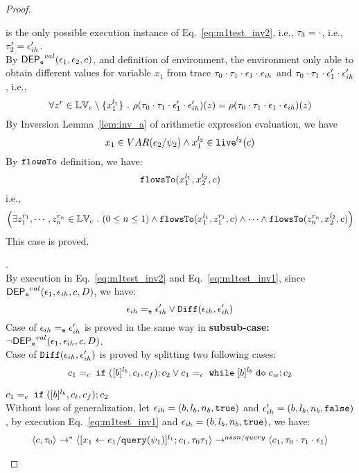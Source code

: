 \begin{proof}
\begin{case}[$\trace_2 = \trace_{ih} \cdot \event_{ih}$]
\begin{subcase}
\begin{subsubcase}
is the only possible execution instance of Eq.~\ref{eq:m1test_inv2}, i.e., $\mathtt{\tau}_3 = \cdot$, i.e., $\mathtt{\tau}_2' = \mathtt{\epsilon}_{ih}'$.
\\
By $\mathsf{DEP_{\mathtt{e}}}^{val}(\mathtt{\epsilon}_1, \mathtt{\epsilon}_2, c)$, and definition of environment, 
the environment only able to obtain different values for variable $x_1$ 
from trace $\mathtt{\tau}_0 \cdot \mathtt{\tau}_1 \cdot \mathtt{\epsilon}_1 \cdot \mathtt{\epsilon}_{ih}$ and 
$\mathtt{\tau}_0 \cdot \mathtt{\tau}_1 \cdot \mathtt{\epsilon}_1' \cdot \mathtt{\epsilon}_{ih}'$, i.e.,
\[
  \forall z^r \in \mathbb{LV}_c \setminus \{x_1^{l_1}\} ~.~
  \rho(\mathtt{\tau}_0 \cdot \mathtt{\tau}_1 \cdot \mathtt{\epsilon}_1' \cdot \mathtt{\epsilon}_{ih}') (z) =  
  \rho(\mathtt{\tau}_0 \cdot \mathtt{\tau}_1 \cdot \mathtt{\epsilon}_1 \cdot \mathtt{\epsilon}_{ih}) (z)
\]
By {Inversion Lemma~\ref{lem:inv_a}} of arithmetic expression evaluation, we have 
\[
  x_1 \in VAR(e_2 / \psi_2) \land x_1^{l_2} \in \mathtt{live}^{l_2}(c)
\]
%
By $\mathtt{flowsTo}$ definition, we have:
%
\[
\mathtt{flowsTo}(x_1^{l_1}, {x}_2^{l_2}, c)
\]
i.e.,
%
\[
\Big(\exists z_1^{r_1}, \cdots, z_n^{r_n} \in \mathbb{LV}_{{c}} ~.~ (0 \leq n \leq 1 )
 \land \mathtt{flowsTo}(x_1^{l_1}, z_1^{r_1}, c) \land \cdots \land \mathtt{flowsTo}(z_n^{r_n}, {x}_2^{l_2}, c) \Big)
\]
%
This case is proved.
\end{subsubcase}
%
\begin{subsubcase}.
\label{case:valdep_ihtestdep}
\\
%
By execution in Eq.~\ref{eq:m1test_inv2} and Eq.~\ref{eq:m1test_inv1}, since $\mathsf{DEP_{\mathtt{e}}}^{val}(\mathtt{\epsilon}_1, \mathtt{\epsilon}_{ih}, c, D)$, we have:
\[
  \mathtt{\epsilon}_{ih} =_{\mathtt{e}} \mathtt{\epsilon}_{ih}' \lor \mathtt{Diff}(\mathtt{\epsilon}_{ih}, \mathtt{\epsilon}_{ih}')
\]
%
Case of $\mathtt{\epsilon}_{ih} =_{\mathtt{e}} \mathtt{\epsilon}_{ih}'$ is proved in the same way in \textbf{subsub-case:} $\neg \mathsf{DEP_{\mathtt{e}}}^{val}(\mathtt{\epsilon}_1, \mathtt{\epsilon}_{ih}, c, D)$.
\\
Case of $\mathtt{Diff}(\mathtt{\epsilon}_{ih}, \mathtt{\epsilon}_{ih}')$ is proved by splitting two following cases:
\[
  c_1 =_c \;\mathtt{if}\; ([b]^{l_b}, c_t, c_f);{c}_2
  \lor
  c_1 =_c \;\mathtt{while}\; [b]^{l_b} \;\mathtt{do}\; c_w;{c}_2
\]
\begin{subproof} 
%
$c_1 =_c \;\mathtt{if}\; ([b]^{l_b}, c_t, c_f);{c}_2$ 
\\
Without loss of generalization, 
let $\mathtt{\epsilon}_{ih} = (b, l_b, n_b, \mathtt{true})$ and
$\mathtt{\epsilon}_{ih}' = (b, l_b, n_b, \mathtt{false})$,
by execution Eq.~\ref{eq:m1test_inv1} and $\mathtt{\epsilon}_{ih} = (b, l_b, n_b, \mathtt{true})$, we have:
\[
  \begin{array}{l}   
  \langle {c}, \mathtt{\tau}_0 \rangle \rightarrow^{*} 
  \langle [\mathrel{ {x}_1 \leftarrow e_1 / {\tt query}(\psi_1) }]^{l_1} ; {c}_1, \mathtt{\tau}_0 \mathtt{\tau}_1 \rangle  
  \rightarrow^{assn/query}
  \langle c_1, \mathtt{\tau}_0 \cdot \mathtt{\tau}_1 \cdot \mathtt{\epsilon}_1 \rangle 

\end{array}\]
\end{subproof}
\end{subsubcase}
\end{subcase}
\end{case}
\end{proof}
